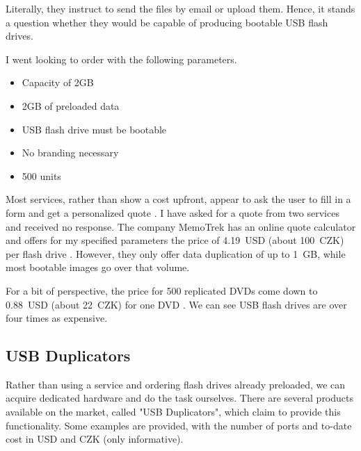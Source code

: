             Literally, they instruct to send the files by email or upload them.  Hence, it stands a question whether they would be capable of producing bootable USB flash drives.
            
            I went looking to order with the following parameters.
            \begin{itemize}
                \item Capacity of 2GB
                \item 2GB of preloaded data
                \item USB flash drive must be bootable
                \item No branding necessary
                \item 500 units
            \end{itemize}
            
            Most services, rather than show a cost upfront, appear to ask the user to fill in a form and get a personalized quote \cite{memorysuppliers} \cite{flashbay} \cite{premiumusb}.  I have asked for a quote from two services and received no response.  The company MemoTrek has an online quote calculator and offers for my specified parameters the price of 4.19~USD (about 100~CZK) per flash drive \cite{memotrek-clip-n-easy}.  However, they only offer data duplication of up to 1~GB, while most bootable images go over that volume.
            
            For a bit of perspective, the price for 500 replicated DVDs come down to 0.88~USD (about 22~CZK) for one DVD \cite{discmakers-quoter}.  We can see USB flash drives are over four times as expensive.
        
        \subsection{USB Duplicators}
            Rather than using a service and ordering flash drives already preloaded, we can acquire dedicated hardware and do the task ourselves.  There are several products available on the market, called "USB Duplicators", which claim to provide this functionality.  Some examples are provided, with the number of ports and to-date cost in USD and CZK (only informative).
            
